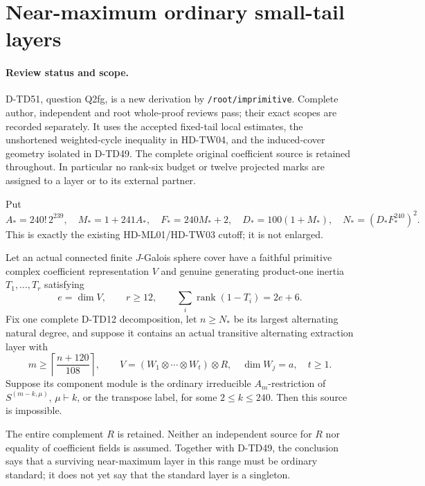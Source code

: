 \section{Near-maximum ordinary small-tail layers}
\label{sec:near-maximum-small-tail}

\paragraph{Review status and scope.}
D-TD51, question Q2fg, is a new derivation by
\texttt{/root/imprimitive}.  Complete author, independent and root
whole-proof reviews pass; their exact scopes are recorded separately.
It uses the accepted fixed-tail local
estimates, the unshortened weighted-cycle inequality in HD-TW04,
and the induced-cover geometry isolated in D-TD49.  The complete
original coefficient source is retained throughout.  In particular
no rank-six budget or twelve projected marks are assigned to a
layer or to its external partner.

Put
\[
 A_*=240!\,2^{239},\quad M_*=1+241A_*,
 \quad F_*=240M_*+2,\quad D_*=100(1+M_*),
 \quad N_*=(D_*F_*^{240})^2.
 \tag{NMT.1}
\]
This is exactly the existing HD-ML01/HD-TW03 cutoff; it is not enlarged.

\begin{theorem}[D-TD51]
Let an actual connected finite $J$-Galois sphere cover have a
faithful primitive complex coefficient representation $V$ and
genuine generating product-one inertia $T_1,\ldots,T_r$ satisfying
\[
 e=\dim V,\qquad r\ge12,\qquad
             \sum_i\operatorname{rank}(1-T_i)=2e+6.
 \tag{NMT.2}
\]
Fix one complete D-TD12 decomposition, let $n\ge N_*$ be its
largest alternating natural degree, and suppose it contains an
actual transitive alternating extraction layer with
\[
 m\ge\left\lceil\frac{n+120}{108}\right\rceil,\qquad
 V=(W_1\otimes\cdots\otimes W_t)\otimes R,\quad
 \dim W_j=a,\quad t\ge1.
 \tag{NMT.3}
\]
Suppose its component module is the ordinary irreducible
$A_m$-restriction of $S^{(m-k,\mu)}$, $\mu\vdash k$, or the
transpose label, for some $2\le k\le240$.
Then this source is impossible.

The entire complement $R$ is retained.  Neither an independent
source for $R$ nor equality of coefficient fields is assumed.
Together with D-TD49, the conclusion says that a surviving
near-maximum layer in this range must be ordinary standard;
it does not yet say that the standard layer is a singleton.
\end{theorem}

